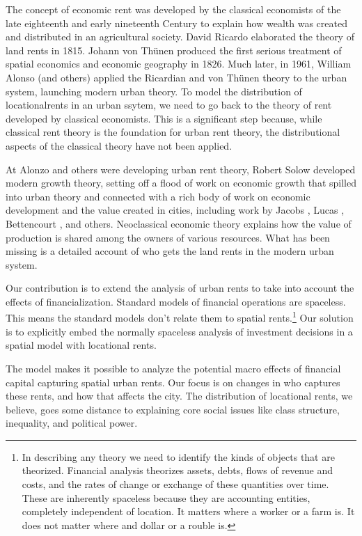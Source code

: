 The concept of economic rent was developed by the classical economists of the late eighteenth and early nineteenth Century to explain how wealth was created and distributed in an agricultural society. David Ricardo \cite{ricardoEssayInfluenceLow1815} elaborated the theory of land rents in 1815. Johann von Th\"unen \cite{vonthunenIsolirteStaatBeziehung1826} produced the first serious treatment of spatial economics and economic geography in 1826. Much later, in 1961, William Alonso (and others) \cite{alonsoModelUrbanLand1960} applied the Ricardian and von Th\"unen theory to the urban system, launching modern urban theory. To model the distribution of locationalrents in an urban ssytem, we need to go back to the theory of rent developed by classical economists. This is a significant step because, while classical rent theory is the foundation for urban rent theory, the distributional aspects of the classical theory have not been applied.

At Alonzo and others were developing urban rent theory, Robert Solow \cite{solowContributionTheoryEconomic1956} developed modern growth theory, setting off a flood of work on economic growth that spilled into urban theory and connected with a rich body of work on economic development and the value created in cities, including work by Jacobs \cite{jacobsEconomyCities1969}, Lucas \cite{lucasMechanicsEconomicDevelopment1988}, Bettencourt \cite{bettencourtGrowthInnovationScaling2007}, and others. 
Neoclassical economic theory explains how the value of production is shared among the owners of various resources.  What has been missing is a detailed account of who gets the land rents in the modern urban system. 

Our contribution is to extend the analysis of urban rents to take into account the effects of financialization. Standard models of financial operations are spaceless. This means the standard models don't relate them to spatial rents.\footnote{In describing any theory we need to identify the kinds of objects that are theorized. Financial analysis theorizes assets, debts, flows of revenue and costs, and the rates of change or exchange of these quantities over time. These are inherently spaceless because they are accounting entities, completely independent of location. It matters where a worker or a farm is. It does not matter where and dollar or a rouble is.} Our solution is to explicitly embed the normally spaceless analysis of investment decisions in a spatial model with locational rents.

The model makes it possible to analyze the potential macro effects of financial capital capturing spatial urban rents. Our focus is on changes in who captures these rents, and how that affects the city. The distribution of locational rents, we believe, goes some distance to explaining core social issues like class structure, inequality, and political power.

